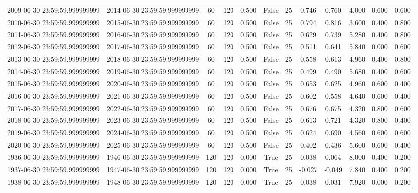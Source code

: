 \begin{table}
\begin{tabular}{lccccccccccc}
2009-06-30 23:59:59.999999999 & 2014-06-30 23:59:59.999999999 & 60 & 120 & 0.500 & False & 25 & 0.746 & 0.760 & 4.000 & 0.600 & 0.600 \\
2010-06-30 23:59:59.999999999 & 2015-06-30 23:59:59.999999999 & 60 & 120 & 0.500 & False & 25 & 0.794 & 0.816 & 3.600 & 0.400 & 0.800 \\
2011-06-30 23:59:59.999999999 & 2016-06-30 23:59:59.999999999 & 60 & 120 & 0.500 & False & 25 & 0.629 & 0.739 & 5.280 & 0.400 & 0.800 \\
2012-06-30 23:59:59.999999999 & 2017-06-30 23:59:59.999999999 & 60 & 120 & 0.500 & False & 25 & 0.511 & 0.641 & 5.840 & 0.000 & 0.600 \\
2013-06-30 23:59:59.999999999 & 2018-06-30 23:59:59.999999999 & 60 & 120 & 0.500 & False & 25 & 0.558 & 0.613 & 4.960 & 0.400 & 0.800 \\
2014-06-30 23:59:59.999999999 & 2019-06-30 23:59:59.999999999 & 60 & 120 & 0.500 & False & 25 & 0.499 & 0.490 & 5.680 & 0.400 & 0.600 \\
2015-06-30 23:59:59.999999999 & 2020-06-30 23:59:59.999999999 & 60 & 120 & 0.500 & False & 25 & 0.653 & 0.625 & 4.960 & 0.600 & 0.400 \\
2016-06-30 23:59:59.999999999 & 2021-06-30 23:59:59.999999999 & 60 & 120 & 0.500 & False & 25 & 0.602 & 0.558 & 4.640 & 0.600 & 0.400 \\
2017-06-30 23:59:59.999999999 & 2022-06-30 23:59:59.999999999 & 60 & 120 & 0.500 & False & 25 & 0.676 & 0.675 & 4.320 & 0.800 & 0.600 \\
2018-06-30 23:59:59.999999999 & 2023-06-30 23:59:59.999999999 & 60 & 120 & 0.500 & False & 25 & 0.613 & 0.721 & 4.320 & 0.800 & 0.400 \\
2019-06-30 23:59:59.999999999 & 2024-06-30 23:59:59.999999999 & 60 & 120 & 0.500 & False & 25 & 0.624 & 0.690 & 4.560 & 0.600 & 0.600 \\
2020-06-30 23:59:59.999999999 & 2025-06-30 23:59:59.999999999 & 60 & 120 & 0.500 & False & 25 & 0.402 & 0.436 & 5.600 & 0.600 & 0.400 \\
1936-06-30 23:59:59.999999999 & 1946-06-30 23:59:59.999999999 & 120 & 120 & 0.000 & True & 25 & 0.038 & 0.064 & 8.000 & 0.400 & 0.200 \\
1937-06-30 23:59:59.999999999 & 1947-06-30 23:59:59.999999999 & 120 & 120 & 0.000 & True & 25 & -0.027 & -0.049 & 7.840 & 0.400 & 0.200 \\
1938-06-30 23:59:59.999999999 & 1948-06-30 23:59:59.999999999 & 120 & 120 & 0.000 & True & 25 & 0.038 & 0.031 & 7.920 & 0.000 & 0.200 \\

\end{tabular}
\end{table}

